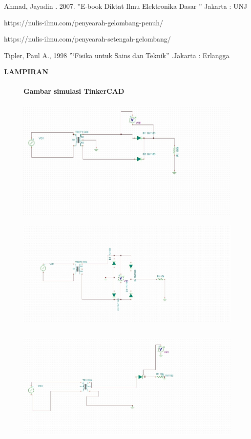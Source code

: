 \documentclass[12pt,a4paper]{article}
\begin{document}
\newpage
\begin{thebibliography}{99} %
 {Ahmad, Jayadin . 2007. ”E-book Diktat Ilmu Elektronika Dasar ” Jakarta : UNJ }

 {https://nulis-ilmu.com/penyearah-gelombang-penuh/}

 {https://nulis-ilmu.com/penyearah-setengah-gelombang/}

 {Tipler, Paul A., 1998 ”‘Fisika untuk Sains dan Teknik” .Jakarta : Erlangga }

\end{thebibliography}

\newpage
\begin{center}
\large{\textbf{LAMPIRAN}}
\end{center}

\newpage
\begin{figure}
\paragraph{Gambar simulasi TinkerCAD}
\paragraph{ }
\begin{center}
\includegraphics[width=12cm, height=6cm]{g1.png}
\includegraphics[width=12cm, height=6cm]{g2.png}
\includegraphics[width=12cm, height=6cm]{g3.png}
\end{center}
\end{figure}
\end{document}
